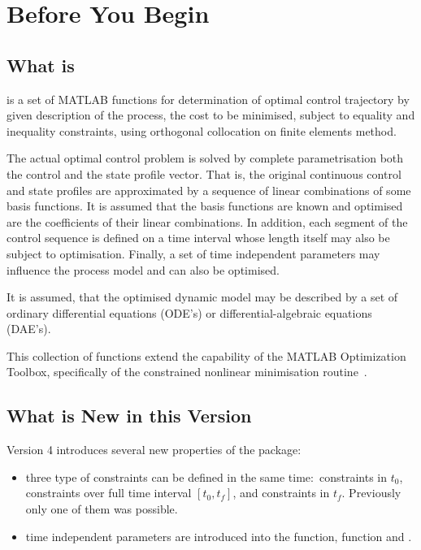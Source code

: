\chapter{Before You Begin}
\label{cha:beforebegin}

\section{What is~}
\label{sec:whatisdynopt}

 is a set of MATLAB functions for determination of optimal
control trajectory by given description of the process, the cost to be
minimised, subject to equality and inequality constraints, using
orthogonal collocation on finite elements method. 

The actual optimal control problem is solved by complete
parametrisation both the control and the state profile vector. That
is, the original continuous control and state profiles are
approximated by a sequence of linear combinations of some basis
functions. It is assumed that the basis functions are known and
optimised are the coefficients of their linear combinations. In
addition, each segment of the control sequence is defined on a time
interval whose length itself may also be subject to
optimisation. Finally, a set of time independent parameters may
influence the process model and can also be optimised.

It is assumed, that the optimised dynamic model may be described by a
set of ordinary differential equations (ODE's) or
differential-algebraic equations (DAE's).

This collection of functions extend the capability of the MATLAB
Optimization Toolbox, specifically of the constrained nonlinear
minimisation routine~. 


\section{What is New in this Version}
\label{sec:what-new-this}


Version 4 introduces several new properties of the package:
\begin{itemize}
\item three type of constraints can be defined in the same
  time:~constraints in $t_{0}$, constraints over full time interval 
  $[t_{0},t_{f}]$, and constraints in $t_{f}$. Previously only one of
  them was possible.
\item time independent parameters are introduced into the 
  function,  function and .
\end{itemize}

